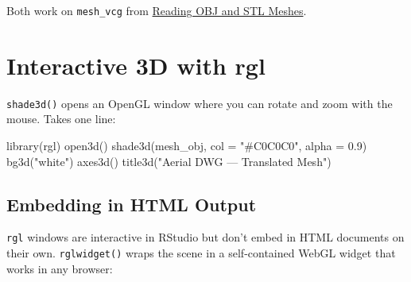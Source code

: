 \documentclass[
  11pt,
  letterpaper,
  DIV=11,
  numbers=noendperiod]{scrreprt}
\newenvironment{Shaded}{\begin{snugshade}}{\end{snugshade}}
\newcommand{\AttributeTok}[1]{\textcolor[rgb]{0.40,0.45,0.13}{#1}}
\newcommand{\CommentTok}[1]{\textcolor[rgb]{0.37,0.37,0.37}{#1}}
\newcommand{\FloatTok}[1]{\textcolor[rgb]{0.68,0.00,0.00}{#1}}
\newcommand{\FunctionTok}[1]{\textcolor[rgb]{0.28,0.35,0.67}{#1}}
\newcommand{\NormalTok}[1]{\textcolor[rgb]{0.00,0.23,0.31}{#1}}
\newcommand{\SpecialCharTok}[1]{\textcolor[rgb]{0.37,0.37,0.37}{#1}}
\newcommand{\StringTok}[1]{\textcolor[rgb]{0.13,0.47,0.30}{#1}}
\begin{document}
Both work on \texttt{mesh\_vcg} from
\hyperref[reading-obj-and-stl-meshes]{Reading OBJ and STL Meshes}.

\section{Interactive 3D with rgl}\label{interactive-3d-with-rgl}

\texttt{shade3d()} opens an OpenGL window where you can rotate and zoom
with the mouse. Takes one line:

\begin{Shaded}
\begin{Highlighting}[]
\FunctionTok{library}\NormalTok{(rgl)}
\FunctionTok{open3d}\NormalTok{()}
\FunctionTok{shade3d}\NormalTok{(mesh\_obj, }\AttributeTok{col =} \StringTok{"\#C0C0C0"}\NormalTok{, }\AttributeTok{alpha =} \FloatTok{0.9}\NormalTok{)}
\FunctionTok{bg3d}\NormalTok{(}\StringTok{"white"}\NormalTok{)}
\FunctionTok{axes3d}\NormalTok{()}
\FunctionTok{title3d}\NormalTok{(}\StringTok{"Aerial DWG — Translated Mesh"}\NormalTok{)}
\end{Highlighting}
\end{Shaded}

\subsection{Embedding in HTML Output}\label{embedding-in-html-output}

\texttt{rgl} windows are interactive in RStudio but don't embed in HTML
documents on their own. \texttt{rglwidget()} wraps the scene in a
self-contained WebGL widget that works in any browser:

\begin{Shaded}
\end{Shaded}
\end{document}

